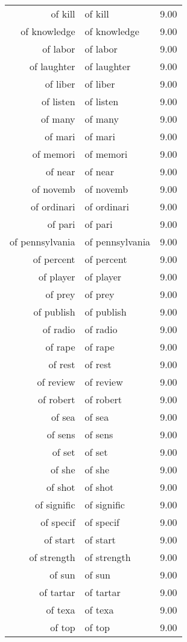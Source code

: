 \begin{table}[ht]
\begin{tabular}{rlr}
  of kill & of kill & 9.00 \\ 
  of knowledge & of knowledge & 9.00 \\ 
  of labor & of labor & 9.00 \\ 
  of laughter & of laughter & 9.00 \\ 
  of liber & of liber & 9.00 \\ 
  of listen & of listen & 9.00 \\ 
  of many & of many & 9.00 \\ 
  of mari & of mari & 9.00 \\ 
  of memori & of memori & 9.00 \\ 
  of near & of near & 9.00 \\ 
  of novemb & of novemb & 9.00 \\ 
  of ordinari & of ordinari & 9.00 \\ 
  of pari & of pari & 9.00 \\ 
  of pennsylvania & of pennsylvania & 9.00 \\ 
  of percent & of percent & 9.00 \\ 
  of player & of player & 9.00 \\ 
  of prey & of prey & 9.00 \\ 
  of publish & of publish & 9.00 \\ 
  of radio & of radio & 9.00 \\ 
  of rape & of rape & 9.00 \\ 
  of rest & of rest & 9.00 \\ 
  of review & of review & 9.00 \\ 
  of robert & of robert & 9.00 \\ 
  of sea & of sea & 9.00 \\ 
  of sens & of sens & 9.00 \\ 
  of set & of set & 9.00 \\ 
  of she & of she & 9.00 \\ 
  of shot & of shot & 9.00 \\ 
  of signific & of signific & 9.00 \\ 
  of specif & of specif & 9.00 \\ 
  of start & of start & 9.00 \\ 
  of strength & of strength & 9.00 \\ 
  of sun & of sun & 9.00 \\ 
  of tartar & of tartar & 9.00 \\ 
  of texa & of texa & 9.00 \\ 
  of top & of top & 9.00 \\ 

\end{tabular}
\end{table}
